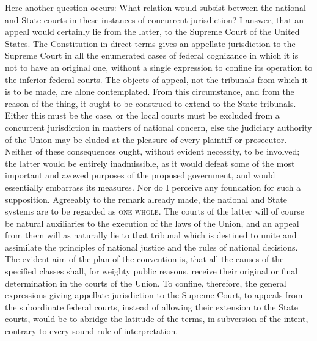 Here another question occurs: What relation would subsist between the national and State courts in these instances of concurrent jurisdiction? I answer, that an appeal would certainly lie from the latter, to the Supreme Court of the United States. The Constitution in direct terms gives an appellate jurisdiction to the Supreme Court in all the enumerated cases of federal cognizance in which it is not to have an original one, without a single expression to confine its operation to the inferior federal courts. The objects of appeal, not the tribunals from which it is to be made, are alone contemplated. From this circumstance, and from the reason of the thing, it ought to be construed to extend to the State tribunals. Either this must be the case, or the local courts must be excluded from a concurrent jurisdiction in matters of national concern, else the judiciary authority of the Union may be eluded at the pleasure of every plaintiff or prosecutor. Neither of these consequences ought, without evident necessity, to be involved; the latter would be entirely inadmissible, as it would defeat some of the most important and avowed purposes of the proposed government, and would essentially embarrass its measures. Nor do I perceive any foundation for such a supposition. Agreeably to the remark already made, the national and State systems are to be regarded as \textsc{one whole}. The courts of the latter will of course be natural auxiliaries to the execution of the laws of the Union, and an appeal from them will as naturally lie to that tribunal which is destined to unite and assimilate the principles of national justice and the rules of national decisions. The evident aim of the plan of the convention is, that all the causes of the specified classes shall, for weighty public reasons, receive their original or final determination in the courts of the Union. To confine, therefore, the general expressions giving appellate jurisdiction to the Supreme Court, to appeals from the subordinate federal courts, instead of allowing their extension to the State courts, would be to abridge the latitude of the terms, in subversion of the intent, contrary to every sound rule of interpretation.

